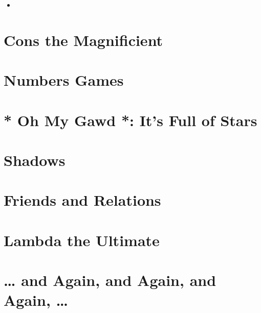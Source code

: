 \documentclass[11pt]{article}
\begin{document}
\begin{itemize}
\item 
\end{itemize}









































\section{Cons the Magnificient}
\label{sec:orgad8fc99}

\section{Numbers Games}
\label{sec:orgcffea2d}

\section{* Oh My Gawd *: It's Full of Stars}
\label{sec:org2cfa03c}

\section{Shadows}
\label{sec:org8b46543}

\section{Friends and Relations}
\label{sec:orgac2d29f}

\section{Lambda the Ultimate}
\label{sec:orgaa80ecb}

\section{\ldots{} and Again, and Again, and Again, \ldots{}}
\label{sec:org2d856b4}
\end{document}
